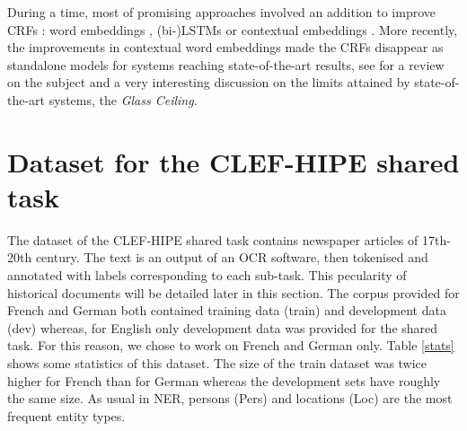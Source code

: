During a time, most of promising approaches involved an addition to improve CRFs : word embeddings \cite{passos-etal-2014-lexicon}, (bi-)LSTMs \cite{lample-etal-2016-neural} %
or contextual embeddings \cite{peters-etal-2018-deep}.
More recently, the improvements in contextual word embeddings made the CRFs disappear as standalone models for systems reaching state-of-the-art results, see \cite{stanislawek-etal-2019-named} for a review on the subject and a very interesting discussion on the limits attained by state-of-the-art systems, the \textit{Glass Ceiling}.

\section{Dataset for the CLEF-HIPE shared task}
\label{sec:dataset}

The dataset of the CLEF-HIPE shared task contains newspaper articles of 17th-20th century. The text is an output of an OCR software, then tokenised and annotated with labels corresponding to each sub-task. This pecularity of historical documents will be detailed later in this section.
The corpus provided for French and German both contained training data (train) and development data (dev) whereas, for English only development data was provided for the shared task. For this reason, we chose to work on French and German only.
Table \ref{stats} shows some statistics of this dataset. The size of the train dataset was twice higher for French than for German whereas the development sets have roughly the same size. As usual in NER, persons (Pers) and locations (Loc) are the most frequent entity types.


